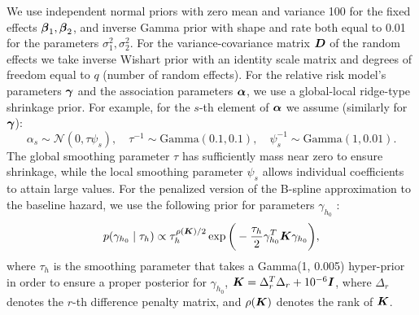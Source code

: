 We use independent normal priors with zero mean and variance 100 for the fixed effects $\boldsymbol{\beta}_1, \boldsymbol{\beta}_2$, and inverse Gamma prior with shape and rate both equal to 0.01 for the parameters $\sigma_1^2, \sigma_2^2$. For the variance-covariance matrix $\boldsymbol{D}$ of the random effects we take inverse Wishart prior with an identity scale matrix and degrees of freedom equal to $q$ (number of random effects). For the relative risk model's parameters $\boldsymbol{\gamma}$ and the association parameters $\boldsymbol{\alpha}$, we use a global-local ridge-type shrinkage prior. For example, for the $s$-{th} element of $\boldsymbol{\alpha}$ we assume (similarly for $\boldsymbol{\gamma}$):
\begin{equation*} 
\alpha_s \sim \mathcal{N}(0, \tau\psi_s), \quad \tau^{-1} \sim \mbox{Gamma}(0.1, 0.1),  \quad \psi_s^{-1} \sim \mbox{Gamma}(1, 0.01).
\end{equation*} 
The global smoothing parameter $\tau$ has sufficiently mass near zero to ensure shrinkage, while the local smoothing parameter $\psi_s$ allows individual coefficients to attain large values. For the penalized version of the B-spline approximation to the baseline hazard, we use the following prior for parameters $\gamma_{h_0}$ \citep{lang2004bayesian}:
\begin{equation*}
p(\gamma_{h_0} \mid \tau_h) \propto \tau_h^{\rho(\boldsymbol{K})/2} \exp\bigg(-\frac{\tau_h}{2}\gamma_{h_0}^T \boldsymbol{K} \gamma_{h_0}\bigg),
\end{equation*}
where $\tau_h$ is the smoothing parameter that takes a Gamma(1, 0.005) hyper-prior in order to ensure a proper posterior for $\gamma_{h_0}$, $\boldsymbol{K} = \Delta_r^T \Delta_r + 10^{-6} \boldsymbol{I}$, where $\Delta_r$ denotes the $r$-th difference penalty matrix, and $\rho(\boldsymbol{K})$ denotes the rank of $\boldsymbol{K}$.
